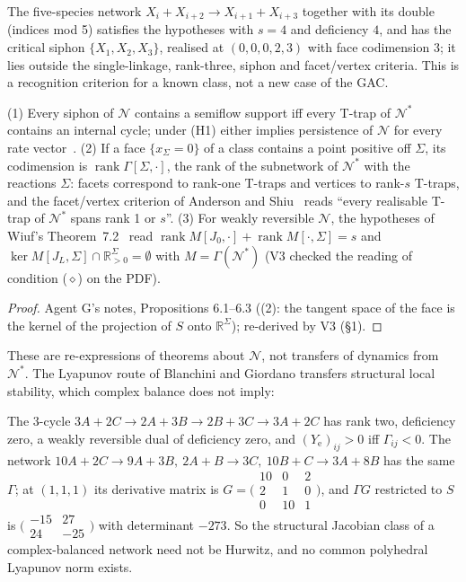 \documentclass[11pt,a4paper]{report}
\newcommand{\Net}{\mathcal{N}}
\newcommand{\Nd}{\mathcal{N}^{*}}
\newcommand{\Ye}{Y_{\mathrm e}}
\newcommand{\Rp}{\mathbb{R}_{>0}}
\begin{document}
The five-species network \(X_i+X_{i+2}\to X_{i+1}+X_{i+3}\) together with its double (indices mod 5) satisfies the
hypotheses with \(s=4\) and deficiency \(4\), and has the critical siphon \(\{X_1,X_2,X_3\}\), realised at \((0,0,0,2,3)\) with
face codimension 3; it lies outside the single-linkage, rank-three, siphon and facet/vertex criteria. This is a recognition
criterion for a known class, not a new case of the GAC.

\begin{proposition}\label{prop:dictionary-boundary}
(1) Every siphon of \(\Net\) contains a semiflow support iff every T-trap of \(\Nd\) contains an internal cycle; under
(H1) either implies persistence of \(\Net\) for every rate vector~\autocite{AngeliDeLeenheerSontag2007}. (2) If a face
\(\{x_\Sigma=0\}\) of a class contains a point positive off \(\Sigma\), its codimension is
\(\operatorname{rank}\Gamma[\Sigma,\cdot]\), the rank of the subnetwork of \(\Nd\) with the reactions \(\Sigma\): facets
correspond to rank-one T-traps and vertices to rank-\(s\) T-traps, and the facet/vertex criterion of Anderson and
Shiu~\autocite[Thm~4.6]{AndersonShiu2010} reads ``every realisable T-trap of \(\Nd\) spans rank 1 or \(s\)''. (3) For weakly
reversible \(\Net\), the hypotheses of Wiuf's Theorem~7.2~\autocite{Wiuf2026} read
\(\operatorname{rank}M[J_0,\cdot]+\operatorname{rank}M[\cdot,\Sigma]=s\) and \(\ker M[J_L,\Sigma]\cap\Rp^\Sigma=\emptyset\) with
\(M=\Gamma(\Nd)\) (V3 checked the reading of condition (\(\diamond\)) on the PDF).
\end{proposition}
\begin{proof}
Agent G's notes, Propositions 6.1--6.3 ((2): the tangent space of the face is the kernel of the projection of \(S\) onto
\(\mathbb{R}^\Sigma\)); re-derived by V3 (§1).
\end{proof}

These are re-expressions of theorems about \(\Net\), not transfers of dynamics from \(\Nd\). The Lyapunov route of Blanchini
and Giordano transfers structural local stability, which complex balance does not imply:

\begin{example}[agent G]\label{ex:BG}
The 3-cycle \(3A+2C\to2A+3B\to2B+3C\to3A+2C\) has rank two, deficiency zero, a weakly reversible dual of deficiency zero,
and \((\Ye)_{ij}>0\) iff \(\Gamma_{ij}<0\). The network \(10A+2C\to9A+3B,\ 2A+B\to3C,\ 10B+C\to3A+8B\) has the same \(\Gamma\);
at \((1,1,1)\) its derivative matrix is \(G=\bigl(\begin{smallmatrix}10&0&2\\2&1&0\\0&10&1\end{smallmatrix}\bigr)\), and \(\Gamma G\)
restricted to \(S\) is \(\bigl(\begin{smallmatrix}-15&27\\24&-25\end{smallmatrix}\bigr)\) with determinant \(-273\). So the
structural Jacobian class of a complex-balanced network need not be Hurwitz, and no common polyhedral Lyapunov norm exists.
\end{example}
\end{document}
